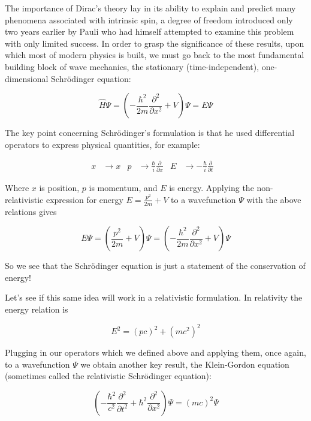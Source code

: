 \documentclass[a4paper,12pt]{book}
\begin{document}
The importance of Dirac's theory\cite{dirac} lay in its ability to explain and predict many phenomena associated with intrinsic spin, a degree of freedom introduced only two years earlier by Pauli who had himself attempted to examine this problem with only limited success\cite{pauli:spin}. In order to grasp the significance of these results, upon which most of modern physics is built, we must go back to the most fundamental building block of wave mechanics, the stationary (time-independent), one-dimensional Schr\"{o}dinger equation:

\begin{equation}\label{TISE}
\hat{H}\Psi=\left(-\frac{\hbar^{2}}{2m} \frac{\partial^{2}}{\partial x^{2}}+V\right)\Psi=E\Psi
\end{equation}

The key point concerning Schr\"{o}dinger's formulation is that he used differential operators to express physical quantities, for example:

\begin{align}\label{ops}
x& \rightarrow x&
  p& \rightarrow \frac{\hbar}{i} \frac{\partial}{\partial x}&
E& \rightarrow -\frac{\hbar}{i} \frac{\partial}{\partial t}&
\end{align}

Where $x$ is position, $p$ is momentum, and $E$ is energy. Applying the non-relativistic expression for energy $E=\frac{p^{2}}{2m}+V$ to a wavefunction $\Psi$ with the above relations gives

\begin{equation}
 E\Psi=\left(\frac{p^{2}}{2m}+V\right)\Psi=\left(-\frac{\hbar^{2}}{2m} \frac{\partial^{2}}{\partial x^{2}}+V\right)\Psi
\end{equation}

So we see that the Schr\"{o}dinger equation is just a statement of the conservation of energy!

Let's see if this same idea will work in a relativistic formulation. In relativity the energy relation is 

\begin{equation}\label{rel}
E^{2}=(pc)^{2}+(mc^{2})^{2} 
\end{equation}

Plugging in our operators which we defined above and applying them, once again, to a wavefunction $\Psi$ we obtain another key result, the Klein-Gordon equation (sometimes called the relativistic Schr\"{o}dinger equation):

\begin{equation}
\left(-\frac{\hbar^{2}}{c^{2}}\frac{\partial^{2}}{\partial t^{2}}+\hbar^{2}\frac{\partial^{2}}{\partial x^{2}}\right)\Psi=(mc)^{2}\Psi 
\end{equation}
\end{document}
